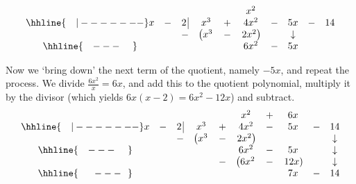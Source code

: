 \documentclass{ximera}
\begin{document}
\begin{ex}
\begin{enumerate}
\[\begin{array}{cccccccccc}
& & & & & x^2 & & &  &  \\ \hhline{~~~|-------}

x & - & 2 \, \vline& x^3 & + & 4x^2 & - & 5x & - & 14 \\

 &  &  -& \left(x^3 \right. & - & \left.  2x^2\right) &  & \downarrow &  &  \\ \hhline{~~~---~~~~} 
 &  &  &   &  & 6 x^2 & - & 5x &  &  \\ 
 
\end{array}\]

\setlength\arraycolsep{5pt}
\setlength\extrarowheight{0pt} 

Now we `bring down' the next term of the quotient, namely $-5x$, and repeat the process. We divide $\frac{6x^2}{x} = 6x$, and add this to the quotient polynomial, multiply it by the divisor (which yields $6x(x - 2) = 6x^{2} - 12x$) and subtract. \setlength\arraycolsep{0.1pt}\setlength\extrarowheight{2pt}\[ \begin{array}{cccccccccc}

& & & & & x^2 & + & 6x &  &  \\ \hhline{~~~|-------}

x & - & 2 \, \vline& x^3 & + & 4x^2 & - & 5x & - & 14 \\

 &  &  -& \left(x^3 \right. & - & \left.  2x^2\right) &  & &  & \downarrow  \\ \hhline{~~~---~~~~} 
 &  &  &   &  & 6 x^2 & - & 5x &  &  \downarrow \\ 
 &  &  &   & - & \left(6 x^2 \right. & - & \left. 12x \right) &  & \downarrow \\ \hhline{~~~~~---~~} 
 &  &  &   &   &  & & 7x  & - & 14 \\
 
\end{array}\]

\setlength\arraycolsep{5pt}
\setlength\extrarowheight{0pt}


\end{enumerate}
\end{ex}
\end{document}
